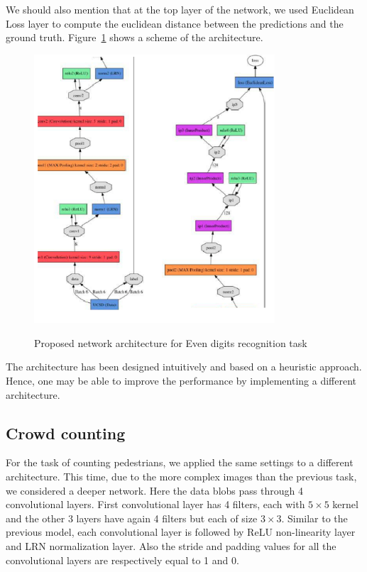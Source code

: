\noindent We should also mention that at the top layer of the network, we used Euclidean Loss layer to compute  the euclidean distance between the predictions and the ground truth.  Figure~\ref{fig:l2cNet} shows a scheme of the architecture.
\begin{figure}[H]
  \centering
   {\includegraphics[width=0.8\textwidth]{images/model2}}
	\caption{Proposed network architecture for Even digits recognition task}
	\label{fig:l2cNet}
\end{figure}

The architecture has been designed intuitively and based on a heuristic approach. Hence, one may be able to improve the performance by implementing a different architecture. 

\subsection{Crowd counting}
\label{subsec:ucsdarch}
For the task of counting pedestrians, we applied the same settings to a different architecture. This time, due to the more complex images than the previous task, we considered a deeper network. Here the data blobs pass through 4 convolutional layers. First convolutional layer has 4 filters, each with $5\times5$ kernel and the other 3 layers have again 4 filters but each of size $3\times3$. Similar to the previous model, each convolutional layer is followed by ReLU non-linearity layer and LRN normalization layer. Also the stride and padding values for all the convolutional layers are respectively equal to 1 and 0. 


